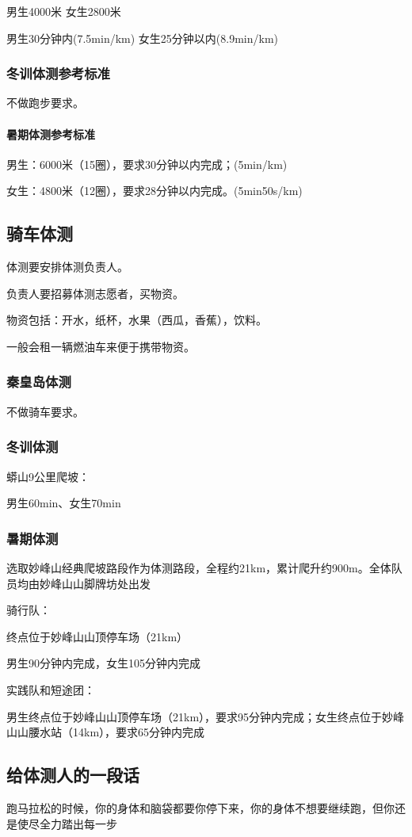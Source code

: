 \documentclass{ctexbook}
\begin{document}
男生4000米 女生2800米

男生30分钟内(7.5min/km) 女生25分钟以内(8.9min/km)
\subsubsection{冬训体测参考标准}
不做跑步要求。
\paragraph{暑期体测参考标准}
男生：6000米（15圈），要求30分钟以内完成；(5min/km)

女生：4800米（12圈），要求28分钟以内完成。(5min50s/km)


\subsection{骑车体测}

体测要安排体测负责人。

负责人要招募体测志愿者，买物资。

物资包括：开水，纸杯，水果（西瓜，香蕉），饮料。

一般会租一辆燃油车来便于携带物资。

\subsubsection{秦皇岛体测}
不做骑车要求。
\subsubsection{冬训体测}
蟒山9公里爬坡：

男生60min、女生70min
\subsubsection{暑期体测}
选取妙峰山经典爬坡路段作为体测路段，全程约21km，累计爬升约900m。全体队员均由妙峰山山脚牌坊处出发

骑行队：

终点位于妙峰山山顶停车场（21km）

男生90分钟内完成，女生105分钟内完成

实践队和短途团：

男生终点位于妙峰山山顶停车场（21km），要求95分钟内完成；女生终点位于妙峰山山腰水站（14km），要求65分钟内完成
\subsection{给体测人的一段话}
跑马拉松的时候，你的身体和脑袋都要你停下来，你的身体不想要继续跑，但你还是使尽全力踏出每一步
\end{document}
